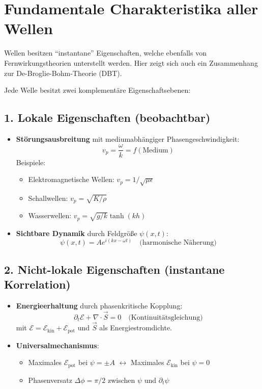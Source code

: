 \section{Fundamentale Charakteristika aller Wellen}
Wellen besitzen \enquote{instantane} Eigenschaften, welche ebenfalls von Fernwirkungstheorien unterstellt werden.
Hier zeigt sich auch ein Zusammenhang zur De-Broglie-Bohm-Theorie (DBT).

Jede Welle besitzt zwei komplementäre Eigenschaftsebenen:

\subsection*{1. Lokale Eigenschaften (beobachtbar)}
\begin{itemize}
    \item \textbf{Störungsausbreitung} mit mediumabhängiger Phasengeschwindigkeit:
    \[
    v_p = \frac{\omega}{k} = f(\text{Medium})
    \]
    Beispiele:
    \begin{itemize}
        \item Elektromagnetische Wellen: $v_p = 1/\sqrt{\mu\epsilon}$
        \item Schallwellen: $v_p = \sqrt{K/\rho}$
        \item Wasserwellen: $v_p = \sqrt{g/k} \tanh(kh)$
    \end{itemize}
    
    \item \textbf{Sichtbare Dynamik} durch Feldgröße $\psi(x,t)$:
    \[
    \psi(x,t) = A e^{i(kx-\omega t)} \quad \text{(harmonische Näherung)}
    \]
\end{itemize}

\subsection*{2. Nicht-lokale Eigenschaften (instantane Korrelation)}
\begin{itemize}
    \item \textbf{Energieerhaltung} durch phasenkritische Kopplung:
    \[
    \partial_t \mathcal{E} + \nabla \cdot \vec{S} = 0 \quad \text{(Kontinuitätsgleichung)}
    \]
    mit $\mathcal{E} = \mathcal{E}_\text{kin} + \mathcal{E}_\text{pot}$ und $\vec{S}$ als Energiestromdichte.
    
    \item \textbf{Universalmechanismus}:
    \begin{itemize}
        \item Maximales $\mathcal{E}_\text{pot}$ bei $\psi = \pm A$ $\leftrightarrow$ Maximales $\mathcal{E}_\text{kin}$ bei $\psi = 0$
        \item Phasenversatz $\Delta\phi = \pi/2$ zwischen $\psi$ und $\partial_t\psi$
    \end{itemize}
\end{itemize}

